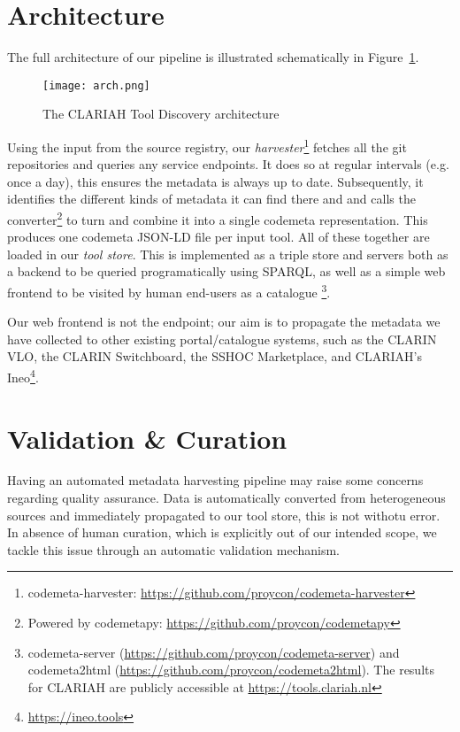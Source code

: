 \documentclass[a4paper,11pt]{article}
\begin{document}
\section{Architecture}

The full architecture of our pipeline is illustrated schematically in
Figure~\ref{fig:architecture}.

\begin{figure}[h]
\texttt{[image: arch.png]}
\caption{The CLARIAH Tool Discovery architecture}
\label{fig:architecture}
\end{figure}

Using the input from the source registry, our
\emph{harvester}\footnote{codemeta-harvester:
\url{https://github.com/proycon/codemeta-harvester}} fetches all the git
repositories and queries any service endpoints. It does so at regular intervals
(e.g. once a day), this ensures the metadata is always up to date. Subsequently, it
identifies the different kinds of metadata it can find there and and calls the
converter\footnote{Powered by codemetapy:
\url{https://github.com/proycon/codemetapy}} to turn and combine it into a
single codemeta representation. This produces one codemeta JSON-LD file per
input tool. All of these together are loaded in our \emph{tool store}. This is
implemented as a triple store and servers both as a backend to be queried programatically using SPARQL,
as well as a simple web frontend to be visited by human end-users as a catalogue
\footnote{codemeta-server
(\url{https://github.com/proycon/codemeta-server}) and codemeta2html
(\url{https://github.com/proycon/codemeta2html}). The results for CLARIAH are
publicly accessible at \url{https://tools.clariah.nl}}.

Our web frontend is not the endpoint; our aim is to propagate the metadata
we have collected to other existing portal/catalogue systems, such as the
CLARIN VLO, the CLARIN Switchboard, the SSHOC Marketplace, and CLARIAH's Ineo\footnote{\url{https://ineo.tools}}.

\section{Validation \& Curation}

Having an automated metadata harvesting pipeline may raise some concerns
regarding quality assurance. Data is automatically converted from heterogeneous
sources and immediately propagated to our tool store, this is not withotu
error. In absence of human curation, which is explicitly out of our intended
scope, we tackle this issue through an automatic validation mechanism.
\end{document}
